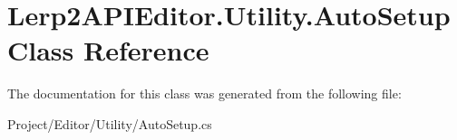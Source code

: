 \hypertarget{class_lerp2_a_p_i_editor_1_1_utility_1_1_auto_setup}{}\section{Lerp2\+A\+P\+I\+Editor.\+Utility.\+Auto\+Setup Class Reference}
\label{class_lerp2_a_p_i_editor_1_1_utility_1_1_auto_setup}


The documentation for this class was generated from the following file\+:\begin{DoxyCompactItemize}
\item 
Project/\+Editor/\+Utility/Auto\+Setup.\+cs\end{DoxyCompactItemize}
